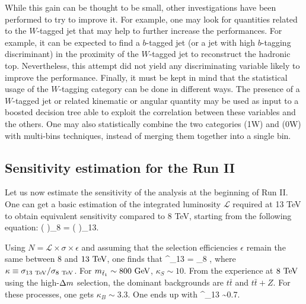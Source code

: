     While this gain can be thought to be small, other investigations have been
    performed to try to improve it.  For example, one may look for quantities
    related to the $W$-tagged jet that may help to further increase the
    performances. For example, it can be expected to find a $b$-tagged jet (or a
    jet with high $b$-tagging discriminant) in the proximity of the $W$-tagged
    jet to reconstruct the hadronic top. Nevertheless, this attempt did not
    yield any discriminating variable likely to improve the performance.
    Finally, it must be kept in mind that the statistical usage of the
    $W$-tagging category can be done in different ways. The presence of a
    $W$-tagged jet or related kinematic or angular quantity may be used as input
    to a boosted decision tree able to exploit the correlation between these
    variables and the others.  One may also statistically combine the two
    categories (1W) and (0W) with multi-bins techniques, instead of merging them
    together into a single bin.

    \subsection{Sensitivity estimation for the Run II}

    Let us now estimate the sensitivity of the analysis at the beginning of Run
    II.  One can get a basic estimation of the integrated luminosity
    $\mathcal{L}$ required at 13 TeV to obtain equivalent sensitivity compared
    to 8 TeV, starting from the following equation:
    {
        \left(
        \right)_{8\TeV}
        =
        \left(
        \right)_{13\TeV}.
    }

    Using $N = \mathcal{L} \times \sigma \times \epsilon$ and assuming that the
    selection efficiencies $\epsilon$ remain the same between $8$ and $13~\text{TeV}$,
    one finds that
    {
        ^_{13\TeV}
        =
        _{8\TeV}
        \times
        ,
    }
    where $\kappa \equiv \sigma_{13~\text{TeV}} / \sigma_{8~\text{TeV}}$. For
    $m_{\tilde{t}_1} \sim 800~\text{GeV}$, $\kappa_S \sim 10$. From the experience at
    $8~\text{TeV}$ using the high-$\Delta m$ selection, the dominant backgrounds are
    $t\bar{t}$ and $t\bar{t}+Z$. For these processes, one gets $\kappa_B \sim
    3.3$. One ends up with
    {
        ^_{13\TeV} \sim 0.7\invfb.
    }


